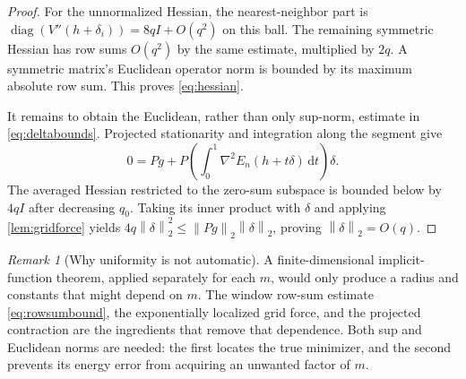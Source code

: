 \documentclass[11pt,a4paper]{article}
\theoremstyle{definition}
\theoremstyle{remark}
\newtheorem{remark}[theorem]{Remark}
\newcommand{\dd}{\,\mathrm d}
\newcommand{\diag}{\operatorname{diag}}
\newcommand{\norm}[1]{\left\lVert#1\right\rVert}
\begin{document}
\begin{proof}
For the unnormalized Hessian, the nearest-neighbor part is
$\diag(V''(h+\delta_i))=8qI+O(q^2)$ on this ball. The remaining
symmetric Hessian has row sums $O(q^2)$ by the same estimate, multiplied
by $2q$. A symmetric matrix's Euclidean operator norm is bounded by its
maximum absolute row sum. This proves \eqref{eq:hessian}.

It remains to obtain the Euclidean, rather than only sup-norm, estimate
in \eqref{eq:deltabounds}. Projected stationarity and integration along
the segment give
\[
 0=Pg+P\left(\int_0^1\nabla^2E_n(h+t\delta)\dd t\right)\delta.
\]
The averaged Hessian restricted to the zero-sum subspace is bounded below
by $4qI$ after decreasing $q_0$. Taking its inner product with $\delta$
and applying \cref{lem:gridforce} yields
$4q\norm\delta_2^2\le\norm{Pg}_2\norm\delta_2$, proving
$\norm\delta_2=O(q)$.
\end{proof}

\begin{remark}[Why uniformity is not automatic]
A finite-dimensional implicit-function theorem, applied separately for
each $m$, would only produce a radius and constants that might depend on
$m$. The window row-sum estimate \eqref{eq:rowsumbound}, the exponentially
localized grid force, and the projected contraction are the ingredients
that remove that dependence. Both sup and Euclidean norms are needed:
the first locates the true minimizer, and the second prevents its energy
error from acquiring an unwanted factor of $m$.
\end{remark}
\end{document}
